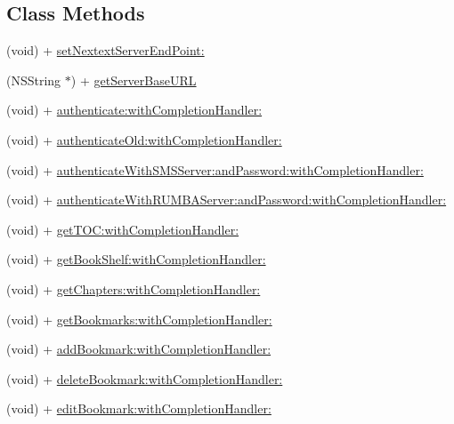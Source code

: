 \subsection*{Class Methods}
\begin{DoxyCompactItemize}
\item 
(void) + \hyperlink{interface_pxe_player_interface_af117cc19f46d2a85c30d7d66a2b349ec}{set\-Nextext\-Server\-End\-Point\-:}
\item 
(N\-S\-String $\ast$) + \hyperlink{interface_pxe_player_interface_af9dff569fecdbfadc491b0b7bfce77e4}{get\-Server\-Base\-U\-R\-L}
\item 
(void) + \hyperlink{interface_pxe_player_interface_a273d6f01ad4e1c52e7f3ebeb30f6eab2}{authenticate\-:with\-Completion\-Handler\-:}
\item 
(void) + \hyperlink{interface_pxe_player_interface_a9a3fa4bfa8133105f5c8080e28cab0e4}{authenticate\-Old\-:with\-Completion\-Handler\-:}
\item 
(void) + \hyperlink{interface_pxe_player_interface_a5cac116a1d73d9c2106e3c8675c47a68}{authenticate\-With\-S\-M\-S\-Server\-:and\-Password\-:with\-Completion\-Handler\-:}
\item 
(void) + \hyperlink{interface_pxe_player_interface_a129aab37f2c42ceb7d5d8bde7ef3c831}{authenticate\-With\-R\-U\-M\-B\-A\-Server\-:and\-Password\-:with\-Completion\-Handler\-:}
\item 
(void) + \hyperlink{interface_pxe_player_interface_aea9855cabf74d3db994ca860bae1f31f}{get\-T\-O\-C\-:with\-Completion\-Handler\-:}
\item 
(void) + \hyperlink{interface_pxe_player_interface_a00291d858b21af3e3cc9ad6c464918ce}{get\-Book\-Shelf\-:with\-Completion\-Handler\-:}
\item 
(void) + \hyperlink{interface_pxe_player_interface_aac1ac3051dbd2740e68694447b321e0e}{get\-Chapters\-:with\-Completion\-Handler\-:}
\item 
(void) + \hyperlink{interface_pxe_player_interface_ae3db598718ee36454dfb57b9495f01f8}{get\-Bookmarks\-:with\-Completion\-Handler\-:}
\item 
(void) + \hyperlink{interface_pxe_player_interface_a5360104ecba1956efba55a943af91cd5}{add\-Bookmark\-:with\-Completion\-Handler\-:}
\item 
(void) + \hyperlink{interface_pxe_player_interface_a960cb324749b46cb8fcbc05ada3be489}{delete\-Bookmark\-:with\-Completion\-Handler\-:}
\item 
(void) + \hyperlink{interface_pxe_player_interface_a2a2b238e030044ee81df0cf6e4e276fe}{edit\-Bookmark\-:with\-Completion\-Handler\-:}

\end{DoxyCompactItemize}
